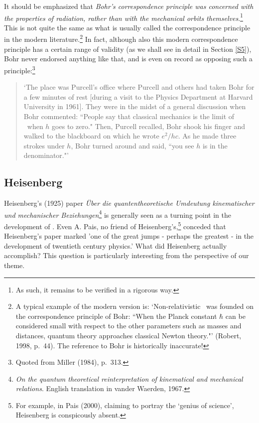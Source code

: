 \documentclass[12pt,titlepage]{article}
\begin{document}
It should be emphasized that {\it Bohr's correspondence principle was concerned with the properties of radiation, rather than with the mechanical orbits themselves}.\footnote{As such, it remains to be verified in a rigorous way.}
This  is not quite  the same as what is usually called the correspondence principle in the modern literature.\footnote{A typical example of the modern version is:  `Non-relativistic \qm\ was founded on the correspondence principle of Bohr: ``When the Planck constant $\hbar$ can be considered small with respect to the other parameters such as masses and distances, quantum theory approaches classical Newton theory."'  (Robert, 1998, p.\ 44). The reference to Bohr is historically inaccurate!} In fact, although also this modern correspondence principle has a certain range of validity (as we shall see in detail in Section \ref{S5}), Bohr never endorsed anything like that, and is even on record as opposing such a principle:\footnote{Quoted from Miller (1984), p.\ 313.}
\begin{quote}
`The place was Purcell's office where Purcell and others had taken Bohr for a few minutes of rest [during a visit to the Physics Department at Harvard University in 1961]. They were in the midst of a general discussion when Bohr commented: ``People say that classical mechanics is the limit of \qm\ when $h$ goes to zero." Then, Purcell recalled, Bohr shook his finger and walked to the blackboard on which he wrote $e^2/hc$. As he made three strokes under $h$, Bohr turned around and said, ``you see $h$ is in the denominator."'  
\end{quote} 
\subsection{Heisenberg}\label{heis}
Heisenberg's (1925) paper \textit{\"{U}ber die quantentheoretische Umdeutung kinematischer und mechanischer Beziehungen}\footnote{\textit{On the quantum theoretical reinterpretation of kinematical and mechanical relations}.  English translation in  vander Waerden, 1967.} is generally seen as a turning point in the development of \qm. Even A. Pais, no friend of Heisenberg's,\footnote{For example, in Pais (2000), claiming to portray the `genius of science', Heisenberg is conspicously absent.}  conceded that  Heisenberg's paper marked  'one of the great jumps - perhaps the greatest - in the development of twentieth century physics.' What did Heisenberg actually accomplish? This question is particularly interesting from the perspective of our theme.
\end{document}
